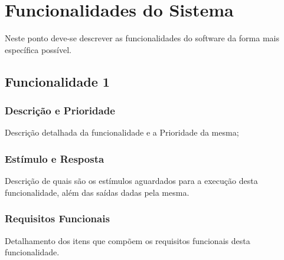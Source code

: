 \chapter{Funcionalidades do Sistema}

Neste ponto deve-se descrever as funcionalidades do software da forma mais específica possível.

\section{Funcionalidade 1}

\subsection{Descrição e Prioridade}

Descrição detalhada da funcionalidade e a Prioridade da mesma;

\subsection{Estímulo e Resposta}

Descrição de quais são os estímulos aguardados para a execução desta funcionalidade, além das saídas dadas pela mesma.

\subsection{Requisitos Funcionais}

Detalhamento dos itens que compõem os requisitos funcionais desta funcionalidade.
